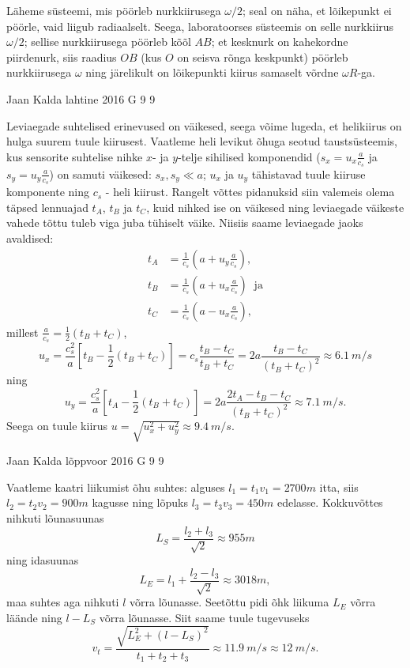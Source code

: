 \documentclass[11pt]{article}
\begin{document}
{{\ifSolution
Läheme süsteemi, mis pöörleb nurkkiirusega $\omega/2$; seal on näha, et lõikepunkt ei pöörle, vaid liigub radiaalselt.
Seega, laboratoorses süsteemis on selle nurkkiirus $\omega/2$; sellise nurkkiirusega pöörleb kõõl $AB$; et kesknurk on kahekordne piirdenurk, siis 
raadius $OB$ (kus $O$ on seisva rõnga keskpunkt) pöörleb nurkkiirusega $\omega$ ning järelikult on lõikepunkti kiirus samaselt võrdne $\omega R$-ga.
\fi
}

{Jaan Kalda} %
{lahtine} %
{2016} %
{G 9} %
{9} %
{

\ifSolution
Leviaegade suhtelised erinevused on väikesed, seega võime lugeda, et helikiirus on hulga suurem tuule kiirusest.
Vaatleme heli levikut õhuga seotud taustsüsteemis, kus sensorite suhtelise nihke $x$- ja $y$-telje sihilised komponendid ($s_x=u_x\frac a{c_s}$ ja 
$s_y=u_y\frac a{c_s}$) on samuti väikesed: $s_x, s_y\ll a$; $u_x$ ja $u_y$ tähistavad tuule kiiruse komponente ning $c_s$ - heli kiirust.
Rangelt võttes pidanuksid siin valemeis olema täpsed lennuajad $t_A$, $t_B$ ja $t_C$, kuid nihked ise on väikesed ning leviaegade 
väikeste vahede tõttu tuleb viga juba tühiselt väike. Niisiis saame leviaegade jaoks avaldised:
\begin{align*}
t_A&=\frac 1{c_s}\left(a+u_y\frac a{c_s}\right),\\
t_B&=\frac 1{c_s}\left(a+u_x\frac a{c_s}\right)\;\; \mbox{ja}\\
t_C&=\frac 1{c_s}\left(a-u_x\frac a{c_s}\right),
\end{align*}
millest $ \frac a{c_s}=\frac 12(t_B+t_C)$, $$u_x=\frac {c_s^2}a\left[t_B-\frac 12(t_B+t_C)\right]=c_s\frac{t_B-t_C}{t_B+t_C}=2a\frac{t_B-t_C}{(t_B+t_C)^2}\approx \SI{6.1}{m/s}$$
ning 
$$u_y=\frac {c_s^2}a\left[t_A-\frac 12(t_B+t_C)\right]=2a\frac{2t_A-t_B-t_C}{(t_B+t_C)^2}\approx \SI{7.1}{m/s}.$$
Seega on tuule kiirus $u=\sqrt{u_x^2+u_y^2}\approx \SI{9.4}{m/s}$.
\fi
}

{Jaan Kalda} %
{lõppvoor} %
{2016} %
{G 9} %
{9} %
{

\ifSolution
Vaatleme kaatri liikumist õhu suhtes: alguses $l_1=t_1v_1=\SI{2700}m$ itta, siis $l_2=t_2v_2=\SI{900}m$ kagusse
ning lõpuks $l_3=t_3v_3=\SI{450}m$ edelasse. Kokkuvõttes nihkuti lõunasuunas 
\[
L_S=\frac{l_2+l_3}{\sqrt 2}\approx \SI{955}m
\]
ning idasuunas
\[
L_E=l_1+\frac{l_2-l_3}{\sqrt 2}\approx \SI{3018}m,
\]
maa suhtes aga nihkuti $l$ võrra lõunasse. Seetõttu pidi õhk liikuma $L_E$ võrra läände ning $l-L_S$ võrra lõunasse. Siit saame tuule tugevuseks 
$$v_t=\frac{\sqrt{L_E^2+(l-L_S)^2}}{t_1+t_2+t_3}\approx \SI{11.9}{m/s}\approx \SI{12}{m/s}.$$ 
\fi
}

}
\end{document}
